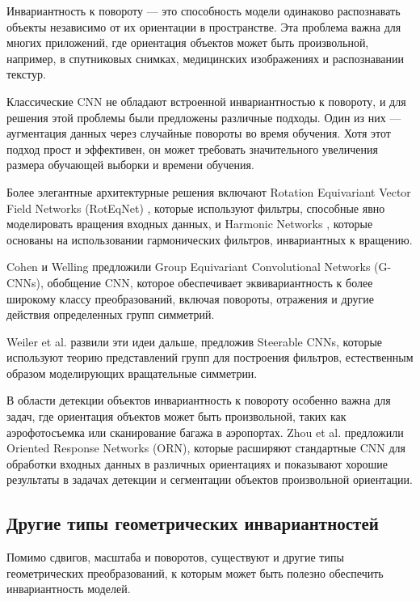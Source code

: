 Инвариантность к повороту — это способность модели одинаково распознавать объекты независимо от их ориентации в пространстве. Эта проблема важна для многих приложений, где ориентация объектов может быть произвольной, например, в спутниковых снимках, медицинских изображениях и распознавании текстур.

Классические CNN не обладают встроенной инвариантностью к повороту, и для решения этой проблемы были предложены различные подходы. Один из них — аугментация данных через случайные повороты во время обучения. Хотя этот подход прост и эффективен, он может требовать значительного увеличения размера обучающей выборки и времени обучения.

Более элегантные архитектурные решения включают Rotation Equivariant Vector Field Networks (RotEqNet) \cite{Marcos2017}, которые используют фильтры, способные явно моделировать вращения входных данных, и Harmonic Networks \cite{Worrall2017}, которые основаны на использовании гармонических фильтров, инвариантных к вращению.

Cohen и Welling \cite{Cohen2016} предложили Group Equivariant Convolutional Networks (G-CNNs), обобщение CNN, которое обеспечивает эквивариантность к более широкому классу преобразований, включая повороты, отражения и другие действия определенных групп симметрий.

Weiler et al. \cite{Weiler2018} развили эти идеи дальше, предложив Steerable CNNs, которые используют теорию представлений групп для построения фильтров, естественным образом моделирующих вращательные симметрии.

В области детекции объектов инвариантность к повороту особенно важна для задач, где ориентация объектов может быть произвольной, таких как аэрофотосъемка или сканирование багажа в аэропортах. Zhou et al. \cite{Zhou2017} предложили Oriented Response Networks (ORN), которые расширяют стандартные CNN для обработки входных данных в различных ориентациях и показывают хорошие результаты в задачах детекции и сегментации объектов произвольной ориентации.

\subsection{Другие типы геометрических инвариантностей}
\label{review:other_invariance:others}

Помимо сдвигов, масштаба и поворотов, существуют и другие типы геометрических преобразований, к которым может быть полезно обеспечить инвариантность моделей.

